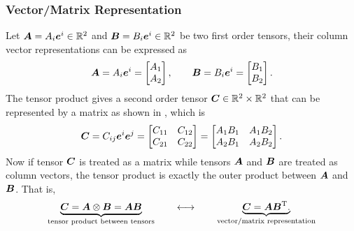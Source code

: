 \subsubsection{Vector/Matrix Representation}
Let $\bm{A}=A_i\bm{e}^i\in\mathbb{R}^2$ and $\bm{B}=B_i\bm{e}^i\in\mathbb{R}^2$ be two first order tensors, their column vector representations can be expressed as
\begin{gather}
\bm{A}=A_i\bm{e}^i=\begin{bmatrix}
A_1\\A_2
\end{bmatrix},\qquad
\bm{B}=B_i\bm{e}^i=\begin{bmatrix}
B_1\\B_2
\end{bmatrix}.
\end{gather}
The tensor product  gives a second order tensor $\bm{C}\in\mathbb{R}^2\times\mathbb{R}^2$ that can be represented by a matrix as shown in , which is
\begin{gather}
\bm{C}=C_{ij}\bm{e}^i\bm{e}^j=\begin{bmatrix}
C_{11}&C_{12}\\
C_{21}&C_{22}
\end{bmatrix}=\begin{bmatrix}
A_1B_1&A_1B_2\\
A_2B_1&A_2B_2
\end{bmatrix}.
\end{gather}
Now if tensor $\bm{C}$ is treated as a matrix while tensors $\bm{A}$ and $\bm{B}$ are treated as column vectors, the tensor product is exactly the outer product between $\bm{A}$ and $\bm{B}$. That is,
\begin{gather}\label{eq:tensor_product}
\underbrace{\bm{C}=\bm{A}\otimes\bm{B}=\bm{A}\bm{B}}_\text{tensor product between tensors}\qquad\longleftrightarrow\qquad\underbrace{\bm{C}=\bm{A}\bm{B}^{\mathrm{T}}.}_\text{{vector/matrix representation}}
\end{gather}

